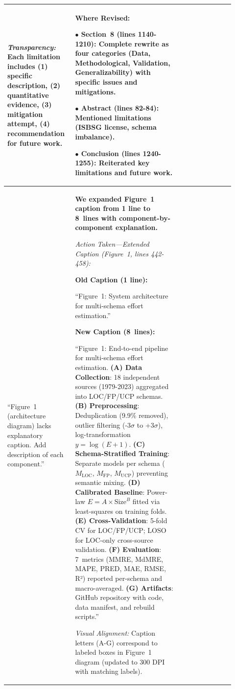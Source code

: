 \documentclass[11pt,a4paper]{article}
\begin{document}
\begin{longtable}{>{\raggedright\arraybackslash}p{0.26\linewidth}|>{\raggedright\arraybackslash}p{0.44\linewidth}|>{\raggedright\arraybackslash}p{0.22\linewidth}}
\textit{Transparency:} Each limitation includes (1) specific description, (2) quantitative evidence, (3) mitigation attempt, (4) recommendation for future work. &

\textbf{Where Revised:}

$\bullet$ \textbf{Section~8} (lines 1140-1210): Complete rewrite as four categories (Data, Methodological, Validation, Generalizability) with specific issues and mitigations.

$\bullet$ \textbf{Abstract} (lines 82-84): Mentioned limitations (ISBSG license, schema imbalance).

$\bullet$ \textbf{Conclusion} (lines 1240-1255): Reiterated key limitations and future work. \\

\midrule

``Figure~1 (architecture diagram) lacks explanatory caption. Add description of each component.'' &

\textbf{We expanded Figure~1 caption from 1 line to 8~lines with component-by-component explanation.}

\textit{Action Taken---Extended Caption (Figure~1, lines 442-458):}

\textbf{Old Caption (1 line):}

``Figure~1: System architecture for multi-schema effort estimation.''

\textbf{New Caption (8~lines):}

``Figure~1: End-to-end pipeline for multi-schema effort estimation. \textbf{(A) Data Collection}: 18 independent sources (1979-2023) aggregated into LOC/FP/UCP schemas. \textbf{(B) Preprocessing}: Deduplication (9.9\% removed), outlier filtering (-3$\sigma$ to +3$\sigma$), log-transformation $y = \log(E+1)$. \textbf{(C) Schema-Stratified Training}: Separate models per schema ($M_{\text{LOC}}$, $M_{\text{FP}}$, $M_{\text{UCP}}$) preventing semantic mixing. \textbf{(D) Calibrated Baseline}: Power-law $E = A \times \text{Size}^B$ fitted via least-squares on training folds. \textbf{(E) Cross-Validation}: 5-fold CV for LOC/FP/UCP; LOSO for LOC-only cross-source validation. \textbf{(F) Evaluation}: 7~metrics (MMRE, MdMRE, MAPE, PRED, MAE, RMSE, R²) reported per-schema and macro-averaged. \textbf{(G) Artifacts}: GitHub repository with code, data manifest, and rebuild scripts.''

\textit{Visual Alignment:} Caption letters (A-G) correspond to labeled boxes in Figure~1 diagram (updated to 300 DPI with matching labels). &


\end{longtable}
\end{document}
